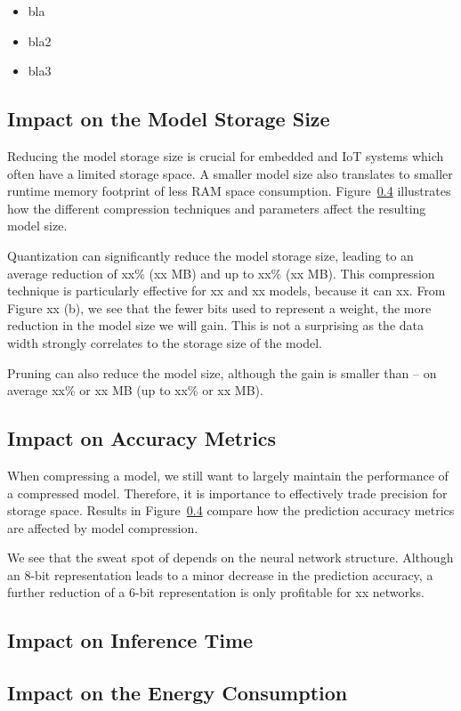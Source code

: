 \begin{itemize}
\item bla
\item bla2
\item bla3
\end{itemize}

\subsection{Impact on the Model Storage Size}
Reducing the model storage size is crucial for embedded and IoT systems which often have a limited storage space. A smaller model size also
translates to smaller runtime memory footprint of less RAM space consumption. Figure~\ref{} illustrates how the different compression
techniques and parameters affect the resulting model size.

Quantization can significantly reduce the model storage size, leading to an average reduction of xx\% (xx MB) and up to xx\% (xx MB). This
compression technique is particularly effective for xx and xx models, because it can xx. From Figure xx (b), we see that the fewer bits
used to represent a weight, the more reduction in the model size we will gain. This is not a surprising as the data width strongly
correlates to the storage size of the model.


Pruning can also reduce the model size, although the gain is smaller than \quantization -- on average xx\% or xx MB (up to xx\% or xx MB).


\subsection{Impact on Accuracy Metrics}
When compressing a model, we still want to largely maintain the performance of a compressed model. Therefore, it is importance to
effectively trade precision for storage space. Results in Figure~\ref{} compare how the prediction accuracy metrics are affected by model
compression.

We see that the sweat spot of \quantization depends on the neural network structure. Although an 8-bit representation leads to a minor
decrease in the prediction accuracy, a further reduction of a 6-bit representation is only profitable for xx networks.

\subsection{Impact on Inference Time}


\subsection{Impact on the Energy Consumption}
